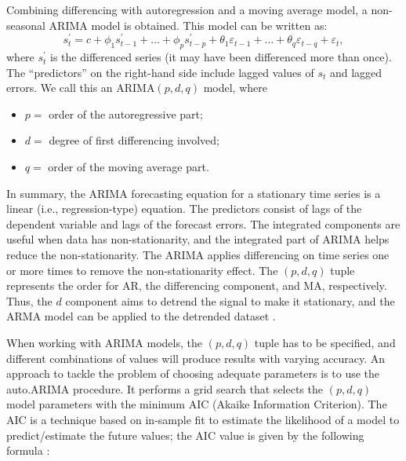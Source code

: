 Combining differencing with autoregression and a moving average model, a non-seasonal ARIMA model is obtained. This model can be written as:
\begin{equation}
    \label{Eq:ARIMApdq}
    s^{'}_{t} = c + \phi_{1} s^{'}_{t-1} + \ldots + \phi_{p} s^{'}_{t-p} + \theta_{1}\varepsilon_{t-1} + \ldots + \theta_{q} \varepsilon_{t-q} + \varepsilon_{t},
\end{equation}
where $s^{'}_{t}$ is the differenced series (it may have been differenced more than once). The ``predictors'' on the right-hand side include lagged values of $s_{t}$ and lagged errors. We call this an ARIMA$(p,d,q)$ model, where
\begin{itemize}
    \item $p =$ order of the autoregressive part;
    \item $d =$ degree of first differencing involved;
    \item $q =$ order of the moving average part. 
\end{itemize}

In summary, the ARIMA forecasting equation for a stationary time series is a linear (i.e., regression-type) equation. The predictors consist of lags of the dependent variable and lags of the forecast errors.  The integrated components are useful when data has non-stationarity, and the integrated part of ARIMA helps reduce the non-stationarity. The ARIMA applies differencing on time series one or more times to remove the non-stationarity effect. The $(p, d, q)$ tuple represents the order for AR, the differencing component, and MA, respectively. Thus, the $d$ component aims to detrend the signal to make it stationary, and the ARMA model can be applied to the detrended dataset \cite{Hyndman2018}.

When working with ARIMA models, the $(p, d, q)$ tuple has to be specified, and different combinations of values will produce results with varying accuracy. An approach to tackle the problem of choosing adequate parameters is to use the auto.ARIMA procedure. It performs a grid search that selects the $(p, d, q)$ model parameters with the minimum AIC (Akaike Information Criterion). The AIC is a technique based on in-sample fit to estimate the likelihood of a model to predict/estimate the future values; the AIC value is given by the following formula \cite{Hyndman2008}:

